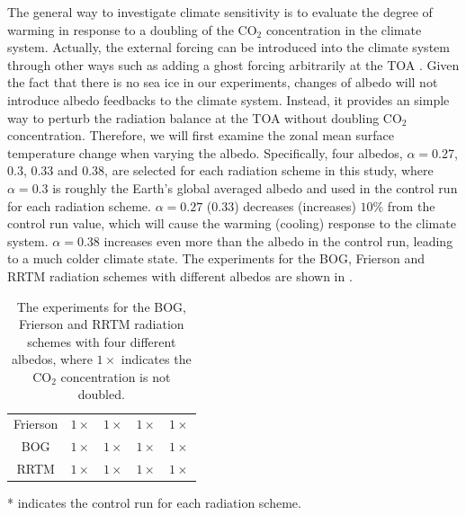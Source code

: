 The general way to investigate climate sensitivity is to evaluate the degree of warming in response to a doubling of the CO$_2$ concentration in the climate system. Actually, the external forcing can be introduced into the climate system through other ways such as adding a ghost forcing  arbitrarily at the TOA \citep{Hansen1997,Alexeev2005}. Given the fact that there is no sea ice in our experiments, changes of albedo will not introduce albedo feedbacks to the climate system. Instead, it provides an simple way to perturb the radiation balance at the TOA without doubling CO$_2$ concentration. Therefore, we will first examine the zonal mean surface temperature change when varying the albedo. Specifically, four albedos, $\alpha=$0.27, 0.3, 0.33 and 0.38, are selected for each radiation scheme in this study, where $\alpha = 0.3$ is roughly the Earth's global averaged albedo and used in the control run for each radiation scheme. $\alpha=0.27$ (0.33) decreases (increases) $10\%$ from the control run value, which will cause the warming (cooling) response to the climate system. $\alpha=0.38$ increases even more than the albedo in the control run, leading to a much colder climate state. The experiments for the BOG, Frierson and RRTM radiation schemes with different albedos are shown in .

\begin{table}[ht]
	\centering
	\caption{The experiments for the BOG, Frierson and RRTM radiation schemes with four different albedos, where $1\times$ indicates the CO$_2$ concentration is not doubled.} %
	\vspace{0.5em}
	\renewcommand{\arraystretch}{1.3}
	\small
	\begin{threeparttable}
	\begin{tabular}{c|*{4}{c}}
		\toprule
		\diagbox{Scheme}{Albedo} &\makebox[3em]{0.38}&\makebox[3em]{0.33}&\makebox[3em]{0.3\tnote{*}}
		&\makebox[3em]{0.27}\\
	    \midrule
		Frierson & $1\times$ & $1\times$ & $1\times$ & $1\times$ \\ 
		BOG &  $1\times$ & $1\times$ & $1\times$& $1\times$ \\
		RRTM & $1\times$ & $1\times$ & $1\times$ & $1\times$ \\
		\bottomrule
	\end{tabular}%
	\begin{tablenotes}
      \item[*] indicates the control run for each radiation scheme.
     \end{tablenotes}
	\end{threeparttable}
	\label{tab:exp_table}
\end{table}

